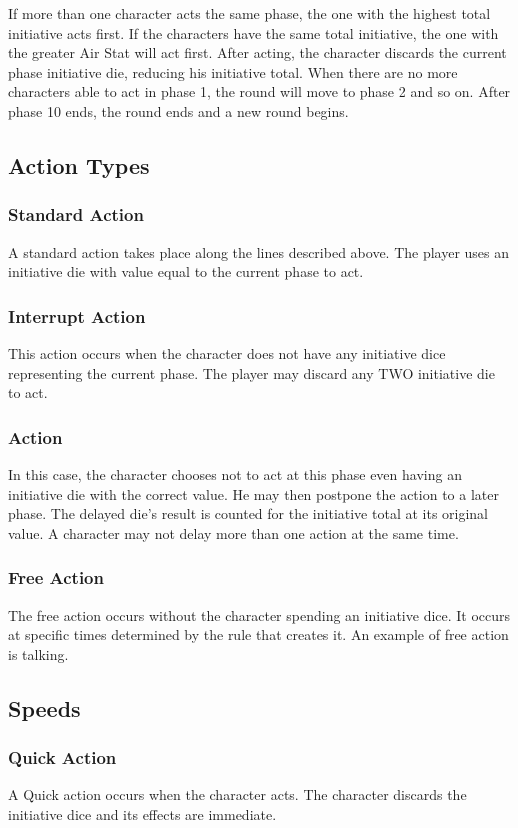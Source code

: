 \begin{multicols}{2}
If more than one character acts the same
phase, the one with the highest total initiative acts
first. If the characters have the same total initiative,
the one with the greater Air Stat will act first. After
acting, the character discards the current phase
initiative die, reducing his initiative total. When
there are no more characters able to act in phase 1,
the round will move to phase 2 and so on. After
phase 10 ends, the round ends and a new round
begins.
\subsection{Action Types}
\subsubsection{Standard Action}
A standard action takes place along the
lines described above. The player uses an initiative
die with value equal to the current phase to act.

\subsubsection{Interrupt Action}
This action occurs when the character
does not have any initiative dice representing the
current phase. The player may discard any TWO
initiative die to act.

\subsubsection{Action}
In this case, the character chooses not to
act at this phase even having an initiative die with
the correct value. He may then postpone the action
to a later phase. The delayed die’s result is counted
for the initiative total at its original value. A
character may not delay more than one action at
the same time.

\subsubsection{Free Action}
The free action occurs without the
character spending an initiative dice. It occurs at
specific times determined by the rule that creates
it. An example of free action is talking.

\subsection{Speeds}
\subsubsection{Quick Action}
A Quick action occurs when the character
acts. The character discards the initiative dice and
its effects are immediate.


\end{multicols}
